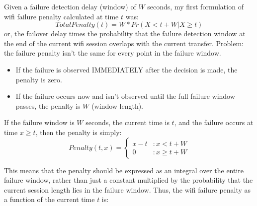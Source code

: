 \documentclass{article}
\begin{document}
Given a failure detection delay (window) of $W$ seconds, my first formulation
of wifi failure penalty calculated at time $t$ was:
\begin{equation*}
TotalPenalty(t) = W * Pr(X < t + W | X \ge t)
\end{equation*}
or, the failover delay times the probability that the failure detection window
at the end of the current wifi session overlaps with the current transfer.
Problem: the failure penalty isn't the same for every point in the failure window.
\begin{itemize}
\item If the failure is observed IMMEDIATELY after the decision is made, 
  the penalty is zero.
\item If the failure occurs now and isn't observed until the full failure window
  passes, the penalty is $W$ (window length).
\end{itemize}
If the failure window is $W$ seconds, the current time is $t$, and the failure 
occurs at time $x \ge t$, then the penalty is simply:
\begin{equation*}
  Penalty(t, x) = \left\{
  \begin{array}{lr}
    x - t & : x < t + W\\
    0     & : x \ge t + W
  \end{array}
  \right.
\end{equation*}

This means that the penalty should be expressed as an integral over the entire
failure window, rather than just a constant multiplied by the probability that
the current session length lies in the failure window.  Thus, the wifi failure 
penalty as a function of the current time $t$ is:
\end{document}
